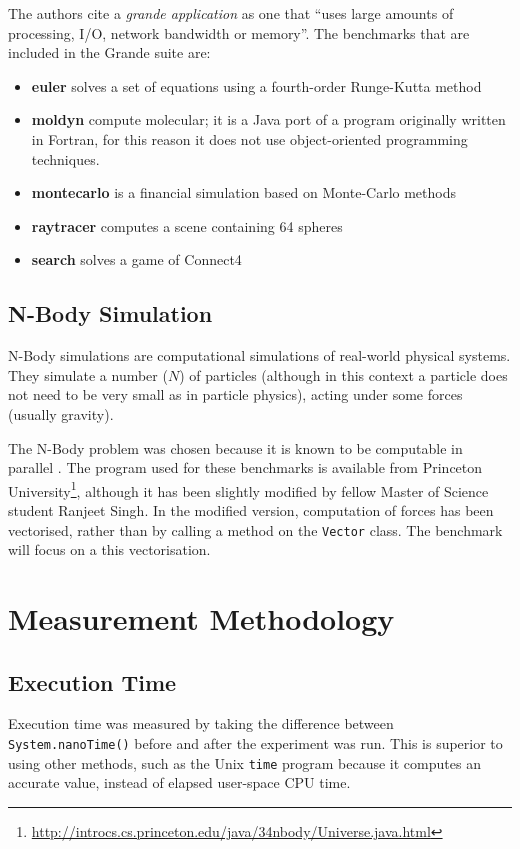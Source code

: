 	The authors cite a \textit{grande application} as one that ``uses large amounts of processing, I/O, network bandwidth or memory''. The benchmarks that are included in the Grande suite are:
	
	\begin{itemize}
		\item \textbf{euler} solves a set of equations using a fourth-order Runge-Kutta method
		\item \textbf{moldyn} compute molecular; it is a Java port of a program originally written in Fortran, for this reason it does not use object-oriented programming techniques.
		\item \textbf{montecarlo} is a financial simulation based on Monte-Carlo methods
		\item \textbf{raytracer} computes a scene containing 64 spheres
		\item \textbf{search} solves a game of Connect4
	\end{itemize}
	
	\subsection{N-Body Simulation} \label{sec:methodology/benchmarks/nbody}
	N-Body simulations \citep{Trenti2008} are computational simulations of real-world physical systems. They simulate a number ($N$) of particles (although in this context a particle does not need to be very small as in particle physics), acting under some forces (usually gravity).
	
	The N-Body problem was chosen because it is known to be computable in parallel \citep{Warren1993,Nyland2007}. The program used for these benchmarks is available from Princeton University\footnote{\url{http://introcs.cs.princeton.edu/java/34nbody/Universe.java.html}}, although it has been slightly modified by fellow Master of Science student Ranjeet Singh. In the modified version, computation of forces has been vectorised, rather than by calling a method on the \texttt{Vector} class. The benchmark will focus on a this vectorisation.
	
\section{Measurement Methodology} \label{sec:methodology/measurements}
	\subsection{Execution Time} \label{sec:methodology/measurements/time}
	Execution time was measured by taking the difference between \texttt{System.nanoTime()} before and after the experiment was run. This is superior to using other methods, such as the Unix \texttt{time} program because it computes an accurate value, instead of elapsed user-space CPU time.
	
